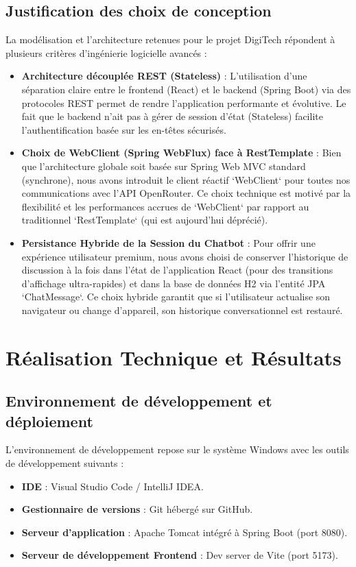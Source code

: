 \documentclass[12pt,a4paper,oneside]{report}
\begin{document}
\section{Justification des choix de conception}
La modélisation et l'architecture retenues pour le projet DigiTech répondent à plusieurs critères d'ingénierie logicielle avancés :
\begin{itemize}
    \item \textbf{Architecture découplée REST (Stateless)} : L'utilisation d'une séparation claire entre le frontend (React) et le backend (Spring Boot) via des protocoles REST permet de rendre l'application performante et évolutive. Le fait que le backend n'ait pas à gérer de session d'état (Stateless) facilite l'authentification basée sur les en-têtes sécurisés.
    \item \textbf{Choix de WebClient (Spring WebFlux) face à RestTemplate} : Bien que l'architecture globale soit basée sur Spring Web MVC standard (synchrone), nous avons introduit le client réactif `WebClient` pour toutes nos communications avec l'API OpenRouter. Ce choix technique est motivé par la flexibilité et les performances accrues de `WebClient` par rapport au traditionnel `RestTemplate` (qui est aujourd'hui déprécié).
    \item \textbf{Persistance Hybride de la Session du Chatbot} : Pour offrir une expérience utilisateur premium, nous avons choisi de conserver l'historique de discussion à la fois dans l'état de l'application React (pour des transitions d'affichage ultra-rapides) et dans la base de données H2 via l'entité JPA `ChatMessage`. Ce choix hybride garantit que si l'utilisateur actualise son navigateur ou change d'appareil, son historique conversationnel est restauré.
\end{itemize}

\chapter{Réalisation Technique et Résultats}

\section{Environnement de développement et déploiement}
L'environnement de développement repose sur le système Windows avec les outils de développement suivants :
\begin{itemize}
    \item \textbf{IDE} : Visual Studio Code / IntelliJ IDEA.
    \item \textbf{Gestionnaire de versions} : Git hébergé sur GitHub.
    \item \textbf{Serveur d'application} : Apache Tomcat intégré à Spring Boot (port 8080).
    \item \textbf{Serveur de développement Frontend} : Dev server de Vite (port 5173).
\end{itemize}
\end{document}
